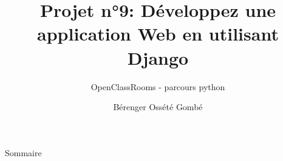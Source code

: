 \documentclass{beamer}
\title{Projet n°9: Développez une application Web en utilisant Django}
\subtitle{OpenClassRooms - parcours python}
\author{Bérenger Ossété Gombé}
\begin{document}
\maketitle

\begin{frame}{Sommaire}
  \tableofcontents
\end{frame}






\end{document}
